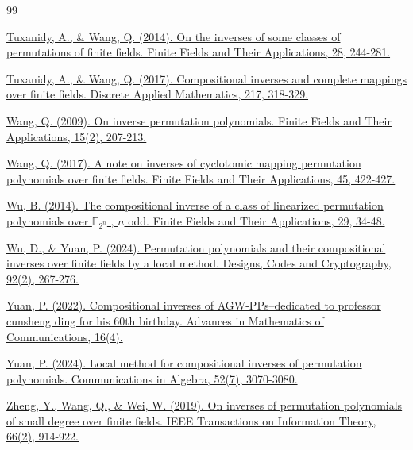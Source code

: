 \documentclass{birkjour}
\theoremstyle{definition}
\theoremstyle{remark}
\numberwithin{equation}{section}
\begin{document}
\begin{thebibliography}{99}
		
	\href{https://doi.org/10.1016/j.ffa.2014.02.006}{Tuxanidy, A., \& Wang, Q. (2014). On the inverses of some classes of permutations of finite fields. Finite Fields and Their Applications, 28, 244-281.}
		
	\href{https://doi.org/10.1016/j.dam.2016.09.009}{Tuxanidy, A., \& Wang, Q. (2017). Compositional inverses and complete mappings over finite fields. Discrete Applied Mathematics, 217, 318-329.}
		
	\href{https://doi.org/10.1016/j.ffa.2008.12.003}{Wang, Q. (2009). On inverse permutation polynomials. Finite Fields and Their Applications, 15(2), 207-213.}
	
	\href{https://doi.org/10.1016/j.ffa.2017.01.006}{Wang, Q. (2017). A note on inverses of cyclotomic mapping permutation polynomials over finite fields. Finite Fields and Their Applications, 45, 422-427.}
		
	\href{https://doi.org/10.1016/j.ffa.2014.03.003}{Wu, B. (2014). The compositional inverse of a class of linearized permutation polynomials over $\mathbb{F}_{2^n}$ , $n$ odd. Finite Fields and Their Applications, 29, 34-48.}
		
	\href{https://doi.org/10.1007/s10623-023-01308-3}{Wu, D., \& Yuan, P. (2024). Permutation polynomials and their compositional inverses over finite fields by a local method. Designs, Codes and Cryptography, 92(2), 267-276.}
		
	\href{https://openurl.ebsco.com/EPDB%3Agcd%3A16%3A23791488/detailv2?sid=ebsco%3Aplink%3Ascholar&id=ebsco%3Agcd%3A161235851&crl=c&link_origin=scholar.google.com}{Yuan, P. (2022). Compositional inverses of AGW-PPs–dedicated to professor cunsheng ding for his 60th birthday. Advances in Mathematics of Communications, 16(4).}
		
	\href{https://doi.org/10.1080/00927872.2024.2314113}{Yuan, P. (2024). Local method for compositional inverses of permutation polynomials. Communications in Algebra, 52(7), 3070-3080.}
		
	\href{https://ieeexplore.ieee.org/stamp/stamp.jsp?arnumber=8823044}{Zheng, Y., Wang, Q., \& Wei, W. (2019). On inverses of permutation polynomials of small degree over finite fields. IEEE Transactions on Information Theory, 66(2), 914-922.}
	

\end{thebibliography}
\end{document}
